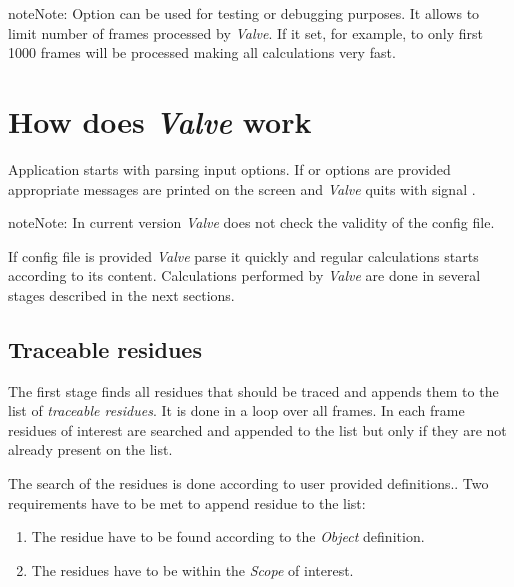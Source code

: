 \documentclass[a4paper,10pt,english]{sphinxmanual}
\begin{document}
\begin{notice}{note}{Note:}
Option  can be used for testing or debugging purposes. It allows to limit number of frames processed by \emph{Valve}.
If it set, for example, to  only first 1000 frames will be processed making all calculations very fast.
\end{notice}


\section{How does \emph{Valve} work}
\label{valve/valve_manual:how-does-valve-work}
Application starts with parsing input options. If  or  options are provided appropriate messages are printed on the screen and \emph{Valve} quits with signal .

\begin{notice}{note}{Note:}
In current version \emph{Valve} does not check the validity of the config file.
\end{notice}

If config file is provided \emph{Valve} parse it quickly and regular calculations starts according to its content. Calculations performed by \emph{Valve} are done in several stages described in the next sections.


\subsection{Traceable residues}
\label{valve/valve_manual:traceable-residues}
The first stage finds all residues that should be traced and appends them to the list of \emph{traceable residues}. It is done in a loop over all frames. In each frame residues of interest are searched and appended to the list but only if they are not already present on the list.

The search of the residues is done according to user provided definitions.. Two requirements have to be met to append residue to the list:
\begin{enumerate}
\item {} 
The residue have to be found according to the \emph{Object} definition.

\item {} 
The residues have to be within the \emph{Scope} of interest.

\end{enumerate}
\end{document}
